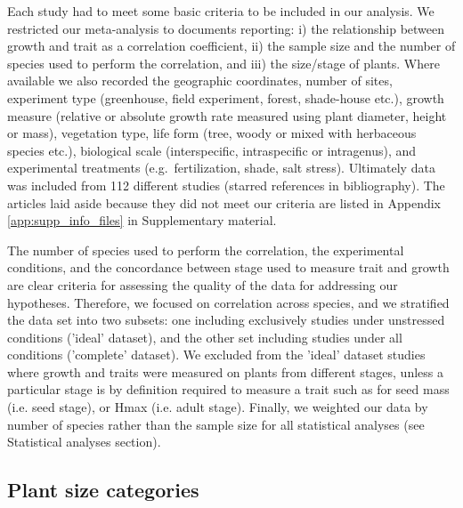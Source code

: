 \documentclass[a4paper]{article}\usepackage[]{graphicx}\usepackage[]{color}
\begin{document}
Each study had to meet some basic criteria to be included in our analysis. We restricted our meta-analysis to documents reporting: i) the relationship between growth and trait as a correlation coefficient, ii) the sample size and the number of species used to perform the correlation, and iii) the size/stage of plants. Where available we also recorded the geographic coordinates, number of sites, experiment type (greenhouse, field experiment, forest, shade-house etc.), growth measure (relative or absolute growth rate measured using plant diameter, height or mass), vegetation type, life form (tree, woody or mixed with herbaceous species etc.), biological scale (interspecific, intraspecific or intragenus), and experimental treatments (e.g.~fertilization, shade, salt stress). Ultimately data was included from 112 different studies (starred references in bibliography). The articles laid aside because they did not meet our criteria are listed in Appendix \ref{app:supp_info_files} in Supplementary material.

The number of species used to perform the correlation, the experimental conditions, and the concordance between stage used to measure trait and growth are clear criteria for assessing the quality of the data for addressing our hypotheses. Therefore, we focused on correlation across species, and we stratified the data set into two subsets: one including exclusively studies under unstressed conditions ('ideal' dataset), and the other set including studies under all conditions ('complete' dataset). We excluded from the 'ideal' dataset studies where growth and traits were measured on plants from different stages, unless a particular stage is by definition required to measure a trait such as for seed mass (i.e. seed stage), or Hmax (i.e. adult stage). Finally, we weighted our data by number of species rather than the sample size for all statistical analyses (see Statistical analyses section).


\subsection*{Plant size categories}\label{plant-size-categories}
\end{document}
